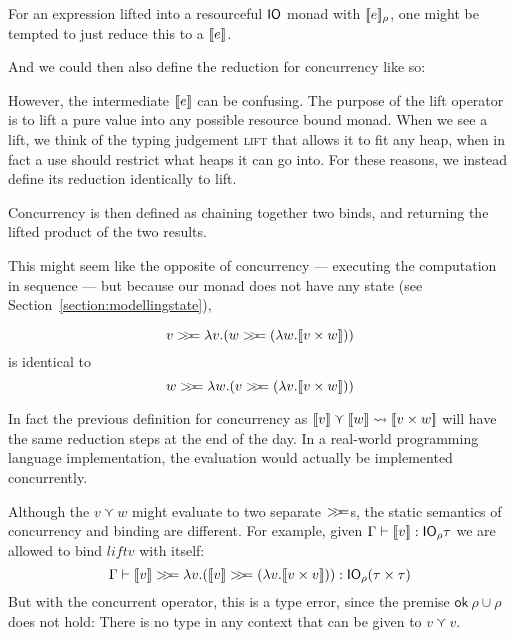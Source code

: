 For an expression lifted into a resourceful $\IO$ monad with
$\use{\rho}{e}$, one might be tempted to just reduce this to a $\lift{e}$.
\begin{mathpar}
\end{mathpar}
And we could then also define the reduction for concurrency like so:
\begin{mathpar}
\end{mathpar}
However, the intermediate $\lift{e}$ can be confusing. The purpose of
the lift operator is to lift a pure value into any possible resource
bound monad. When we see a lift, we think of the typing judgement
\textsc{lift} that allows it to fit any heap, when in fact a use
should restrict what heaps it can go into. For these reasons, we
instead define its reduction identically to lift.
\begin{mathpar}
\end{mathpar}
Concurrency is then defined as chaining together two binds, and
returning the lifted product of the two results.
\begin{mathpar}
\end{mathpar}
This might seem like the opposite of concurrency --- executing the
computation in sequence --- but because our monad does not have any
state (see Section~\ref{section:modellingstate}),
\begin{samepage}
\[v \bind \lambda v . (w \bind (\lambda w . \lift{v \times w}))\]
is identical to
\[w \bind \lambda w . (v \bind (\lambda v . \lift{v \times w}))\]
\end{samepage}
In fact the previous
definition for concurrency as
$\lift{v} \curlyvee \lift{w} \leadsto \llbracket v \times w \rrbracket$ will have the same reduction steps at
the end of the day. In a real-world programming language
implementation, the evaluation would actually be implemented concurrently.

Although the $v \curlyvee w$ might evaluate to two separate $\bind$s, the
static semantics of concurrency and binding are different. For example, given
$\Gamma \vdash \lift{v} : \IO_\rho \tau$ we are allowed to bind $lift{v}$ with itself:
\[
\Gamma \vdash \lift{v} \bind \lambda v . (\lift{v} \bind (\lambda v . \lift{v \times v})) : \IO_\rho (\tau \times \tau)
\]
But with the concurrent operator, this is a type error, since the
premise $\textsf{ok} \ \rho \cup \rho$ does not hold: There is no type in any context
that can be given to $v \curlyvee v$.

